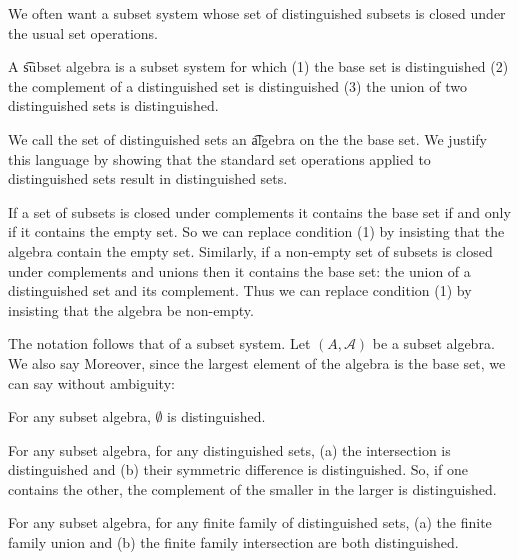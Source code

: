 

We often want a subset system whose set of distinguished subsets is closed under the usual set operations.


A \t{subset algebra} is a subset system for which (1) the base set is distinguished (2) the complement of a distinguished set is distinguished (3) the union of two distinguished sets is distinguished.

We call the set of distinguished sets an \t{algebra} on the the base set.
We justify this language by showing that the standard set operations applied to distinguished sets result in distinguished sets.

If a set of subsets is closed under complements it contains the base set if and only if it contains the empty set.
So we can replace condition (1) by insisting that the algebra contain the empty set.
Similarly, if a non-empty set of subsets is closed under complements and unions then it contains the base set: the union of a distinguished set and its complement.
Thus we can replace condition (1) by insisting that the algebra be non-empty.


The notation follows that of a subset system.
Let $(A, \mathcal{A})$ be a subset algebra.
We also say 
Moreover, since the largest element of the
algebra is the base set, we can say without
ambiguity: 


\begin{prop}
  For any subset algebra, $\emptyset$ is distinguished.
\end{prop}

\begin{prop}
  For any subset algebra,
  for any distinguished sets,
  (a) the intersection is distinguished and
  (b) their symmetric difference is distinguished.
  So, if one contains the other, the complement
  of the smaller in the larger is distinguished.
\end{prop}

\begin{prop}
  For any subset algebra,
  for any finite family of distinguished sets,
  (a) the finite family union and
  (b) the finite family intersection
  are both distinguished.
\end{prop}

